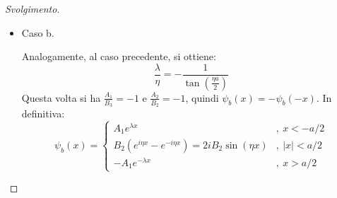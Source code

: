 \documentclass[11pt, a4paper]{scrartcl} %
\numberwithin{equation}{subsection}
\theoremstyle{style2}
\theoremstyle{style1}
\renewcommand\qedsymbol{$\blacksquare$}
\newenvironment{svolgimento}{\renewcommand\qedsymbol{$\spadesuit$}\begin{proof}[Svolgimento]}{\end{proof}}
\begin{document}
\begin{svolgimento}
\begin{itemize}
	La condizione si riscrive come:
	\begin{equation}\label{sca}
	\begin{split}
		&\frac{\lambda  / \eta - i}{\lambda  / \eta + i} = - e^{i\eta a}  \implies \frac{\lambda}{\eta} (1+e^{i\eta} ) = i (1- e^{i\eta a} ) \\
		& \Rightarrow \frac{\lambda}{\eta} = \tan \left(\frac{\eta a}{2}\right) 
	\end{split}
	\end{equation}
	In questo caso, i coefficienti verificano
	\[
		\frac{A_1}{B_3}= -e^{i\eta a} \frac{\lambda  + i \eta}{\lambda  - i \eta} = 1 \hspace{.1cm} ; \hspace{.2cm} \frac{A_2}{B_2}= e^{i\eta a} \frac{\lambda +i\eta }{2i\eta }= 1
	\] 
cio\`e le autofunzioni sono simmetriche rispetto allo zero, quindi sono pari: $\psi_a (x) = \psi_a (-x)$. In definitiva:
\begin{equation}\label{spp}
	\psi _a(x) = \begin{cases}
		A_1 e^{\lambda x} &,\  x < - a/2\\
		B_2 (e^{i\eta x} + e^{-i\eta x} ) = 2B_2 \cos(\eta x) & ,\ \lvert x \rvert < a / 2\\
		A_1 e^{-\lambda x} &,\ x > a / 2
	\end{cases}
\end{equation}
\item Caso b.

	Analogamente, al caso precedente, si ottiene:
	\begin{equation}\label{scb}
	\frac{\lambda }{\eta} = -\frac{1}{\tan\left(\frac{\eta a}{2}\right) }
	\end{equation}
	Questa volta si ha $\frac{A_1}{B_3} = - 1$ e $\frac{A_2}{B_2} = -1$, quindi $\psi _b(x) = - \psi _b(-x)$. In definitiva:
	\begin{equation}\label{spn}
	\psi _b(x) = \begin{cases}
		A_1 e^{\lambda x} &,\  x < - a/2\\
		B_2 (e^{i\eta x} - e^{-i\eta x} ) = 2iB_2 \sin(\eta x) & ,\ \lvert x \rvert < a / 2\\
		-A_1 e^{-\lambda x} &,\ x > a / 2
	\end{cases}
\end{equation}
\end{itemize}
\end{svolgimento}
\end{document}
